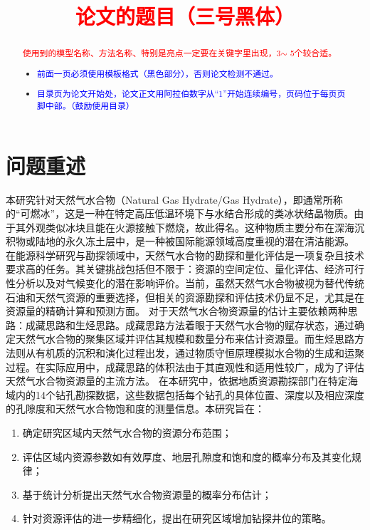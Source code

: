 \documentclass[12pt,a4paper]{nmmcm}
\title{\textcolor{red}{论文的题目（三号黑体）}}
\date{}
\begin{document}
\begin{abstract}
  

  \begin{keywords}
    {\song\xiaosihao
      \textcolor{red}{使用到的模型名称、方法名称、特别是亮点一定要在关键字里出现，3$\sim$ 5个较合适。}}
  \end{keywords}

  \begin{itemize}
    \item \textcolor{blue}{前面一页必须使用模板格式（黑色部分），否则论文检测不通过。}
    \item \textcolor{blue}{ 目录页为论文开始处，论文正文用阿拉伯数字从“1”开始连续编号，页码位于每页页脚中部。（鼓励使用目录）}
  \end{itemize}

\end{abstract}
\maketitle
\renewcommand{\contentsname}{\centerline{\sanhao\bfseries\HEI 目\quad 录}}
\tableofcontents

\newpage
\setcounter{page}{1}
\pagestyle{fancy}
\section{问题重述}
本研究针对天然气水合物（Natural Gas Hydrate/Gas Hydrate），即通常所称的“可燃冰”，这是一种在特定高压低温环境下与水结合形成的类冰状结晶物质。由于其外观类似冰块且能在火源接触下燃烧，故此得名。这种物质主要分布在深海沉积物或陆地的永久冻土层中，是一种被国际能源领域高度重视的潜在清洁能源。
在能源科学研究与勘探领域中，天然气水合物的勘探和量化评估是一项复杂且技术要求高的任务。其关键挑战包括但不限于：资源的空间定位、量化评估、经济可行性分析以及对气候变化的潜在影响评价。当前，虽然天然气水合物被视为替代传统石油和天然气资源的重要选择，但相关的资源勘探和评估技术仍显不足，尤其是在资源量的精确计算和预测方面。
对于天然气水合物资源量的估计主要依赖两种思路：成藏思路和生烃思路。成藏思路方法着眼于天然气水合物的赋存状态，通过确定天然气水合物的聚集区域并评估其规模和数量分布来估计资源量。而生烃思路方法则从有机质的沉积和演化过程出发，通过物质守恒原理模拟水合物的生成和运聚过程。在实际应用中，成藏思路的体积法由于其直观性和适用性较广，成为了评估天然气水合物资源量的主流方法。
在本研究中，依据地质资源勘探部门在特定海域内的14个钻孔勘探数据，这些数据包括每个钻孔的具体位置、深度以及相应深度的孔隙度和天然气水合物饱和度的测量信息。本研究旨在：
\begin{enumerate}
  \item 确定研究区域内天然气水合物的资源分布范围；
  \item 评估区域内资源参数如有效厚度、地层孔隙度和饱和度的概率分布及其变化规律；
  \item 基于统计分析提出天然气水合物资源量的概率分布估计；
  \item 针对资源评估的进一步精细化，提出在研究区域增加钻探井位的策略。
\end{enumerate}
\end{document}
